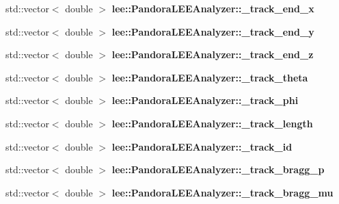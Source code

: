 \begin{DoxyCompactItemize}
\item 
\hypertarget{group__lee_ga78cb36dded5326c08cae77d5af6f3cd2}{std\-::vector$<$ double $>$ {\bfseries lee\-::\-Pandora\-L\-E\-E\-Analyzer\-::\-\_\-track\-\_\-end\-\_\-x}}\label{group__lee_ga78cb36dded5326c08cae77d5af6f3cd2}

\item 
\hypertarget{group__lee_ga55174718268fd53d080c224f60f96488}{std\-::vector$<$ double $>$ {\bfseries lee\-::\-Pandora\-L\-E\-E\-Analyzer\-::\-\_\-track\-\_\-end\-\_\-y}}\label{group__lee_ga55174718268fd53d080c224f60f96488}

\item 
\hypertarget{group__lee_ga147c8d113ee9fc316a7addd39e392d71}{std\-::vector$<$ double $>$ {\bfseries lee\-::\-Pandora\-L\-E\-E\-Analyzer\-::\-\_\-track\-\_\-end\-\_\-z}}\label{group__lee_ga147c8d113ee9fc316a7addd39e392d71}

\item 
\hypertarget{group__lee_ga320eaa4a60f4628c6320c5c721f2899c}{std\-::vector$<$ double $>$ {\bfseries lee\-::\-Pandora\-L\-E\-E\-Analyzer\-::\-\_\-track\-\_\-theta}}\label{group__lee_ga320eaa4a60f4628c6320c5c721f2899c}

\item 
\hypertarget{group__lee_gae045ae6a478b38e3d165ced855b610e4}{std\-::vector$<$ double $>$ {\bfseries lee\-::\-Pandora\-L\-E\-E\-Analyzer\-::\-\_\-track\-\_\-phi}}\label{group__lee_gae045ae6a478b38e3d165ced855b610e4}

\item 
\hypertarget{group__lee_ga801ed095fb9dfb752f424ea91107cffc}{std\-::vector$<$ double $>$ {\bfseries lee\-::\-Pandora\-L\-E\-E\-Analyzer\-::\-\_\-track\-\_\-length}}\label{group__lee_ga801ed095fb9dfb752f424ea91107cffc}

\item 
\hypertarget{group__lee_ga13a633d3b83e96b70adae044df973ec7}{std\-::vector$<$ double $>$ {\bfseries lee\-::\-Pandora\-L\-E\-E\-Analyzer\-::\-\_\-track\-\_\-id}}\label{group__lee_ga13a633d3b83e96b70adae044df973ec7}

\item 
\hypertarget{group__lee_ga4297d696c8a18a62866df4ae2af0115f}{std\-::vector$<$ double $>$ {\bfseries lee\-::\-Pandora\-L\-E\-E\-Analyzer\-::\-\_\-track\-\_\-bragg\-\_\-p}}\label{group__lee_ga4297d696c8a18a62866df4ae2af0115f}

\item 
\hypertarget{group__lee_ga26c2928e27efaef45a0bd73265732f61}{std\-::vector$<$ double $>$ {\bfseries lee\-::\-Pandora\-L\-E\-E\-Analyzer\-::\-\_\-track\-\_\-bragg\-\_\-mu}}\label{group__lee_ga26c2928e27efaef45a0bd73265732f61}


\end{DoxyCompactItemize}

